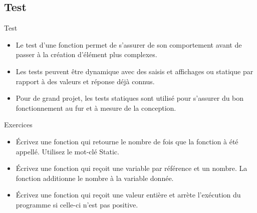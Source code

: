 \documentclass[aspectratio=169,usenames,dvipsnames]{beamer}
\begin{document}
    \subsection{Test}
    \begin{frame}{Test}
        \begin{itemize}
            \item Le test d'une fonction permet de s'assurer de son comportement avant de passer à la création d'élément plus complexes.
            \item Les tests peuvent être dynamique avec des saisis et affichages ou statique par rapport à des valeurs et réponse déjà connus.
            \item Pour de grand projet, les tests statiques sont utilisé pour s'assurer du bon fonctionnement au fur et à mesure de la conception.
        \end{itemize}
    \end{frame}
    \begin{frame}{Exercices}
        \begin{itemize}
            \item Écrivez une fonction qui retourne le nombre de fois que la fonction à été appellé. Utilisez le mot-clé Static.
            \item Écrivez une fonction qui reçoit une variable par référence et un nombre. La fonction additionne le nombre à la variable donnée.
            \item Écrivez une fonction qui reçoit une valeur entière et arrète l'exécution du programme si celle-ci n'est pas positive.
        \end{itemize}
    \end{frame}
\end{document}
